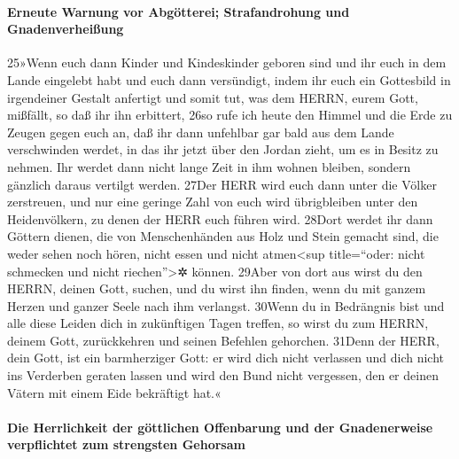 \hypertarget{erneute-warnung-vor-abguxf6tterei-strafandrohung-und-gnadenverheiuxdfung}{%
\paragraph{Erneute Warnung vor Abgötterei; Strafandrohung und
Gnadenverheißung}\label{erneute-warnung-vor-abguxf6tterei-strafandrohung-und-gnadenverheiuxdfung}}

25»Wenn euch dann Kinder und Kindeskinder geboren sind und ihr euch in
dem Lande eingelebt habt und euch dann versündigt, indem ihr euch ein
Gottesbild in irgendeiner Gestalt anfertigt und somit tut, was dem
HERRN, eurem Gott, mißfällt, so daß ihr ihn erbittert, 26so rufe ich
heute den Himmel und die Erde zu Zeugen gegen euch an, daß ihr dann
unfehlbar gar bald aus dem Lande verschwinden werdet, in das ihr jetzt
über den Jordan zieht, um es in Besitz zu nehmen. Ihr werdet dann nicht
lange Zeit in ihm wohnen bleiben, sondern gänzlich daraus vertilgt
werden. 27Der HERR wird euch dann unter die Völker zerstreuen, und nur
eine geringe Zahl von euch wird übrigbleiben unter den Heidenvölkern, zu
denen der HERR euch führen wird. 28Dort werdet ihr dann Göttern dienen,
die von Menschenhänden aus Holz und Stein gemacht sind, die weder sehen
noch hören, nicht essen und nicht atmen\textless sup title=``oder: nicht
schmecken und nicht riechen''\textgreater✲ können. 29Aber von dort aus
wirst du den HERRN, deinen Gott, suchen, und du wirst ihn finden, wenn
du mit ganzem Herzen und ganzer Seele nach ihm verlangst. 30Wenn du in
Bedrängnis bist und alle diese Leiden dich in zukünftigen Tagen treffen,
so wirst du zum HERRN, deinem Gott, zurückkehren und seinen Befehlen
gehorchen. 31Denn der HERR, dein Gott, ist ein barmherziger Gott: er
wird dich nicht verlassen und dich nicht ins Verderben geraten lassen
und wird den Bund nicht vergessen, den er deinen Vätern mit einem Eide
bekräftigt hat.«

\hypertarget{die-herrlichkeit-der-guxf6ttlichen-offenbarung-und-der-gnadenerweise-verpflichtet-zum-strengsten-gehorsam}{%
\paragraph{Die Herrlichkeit der göttlichen Offenbarung und der
Gnadenerweise verpflichtet zum strengsten
Gehorsam}\label{die-herrlichkeit-der-guxf6ttlichen-offenbarung-und-der-gnadenerweise-verpflichtet-zum-strengsten-gehorsam}}


